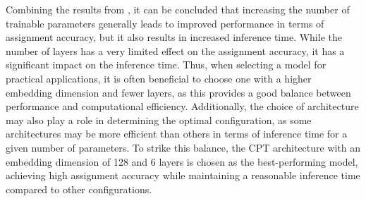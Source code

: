 Combining the results from , it can be concluded that increasing the number of trainable parameters generally leads to improved performance in terms of assignment accuracy, but it also results in increased inference time. While the number of layers has a very limited effect on the assignment accuracy, it has a significant impact on the inference time. Thus, when selecting a model for practical applications, it is often beneficial to choose one with a higher embedding dimension and fewer layers, as this provides a good balance between performance and computational efficiency. Additionally, the choice of architecture may also play a role in determining the optimal configuration, as some architectures may be more efficient than others in terms of inference time for a given number of parameters.
To strike this balance, the CPT architecture with an embedding dimension of 128 and 6 layers is chosen as the best-performing model, achieving high assignment accuracy while maintaining a reasonable inference time compared to other configurations.

